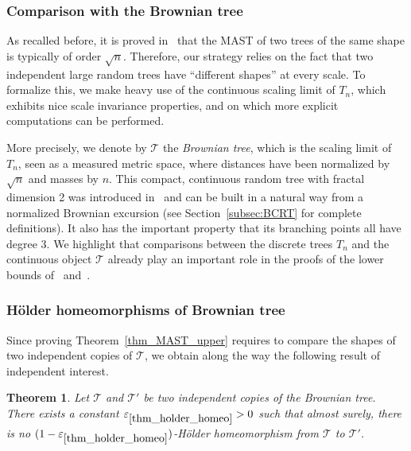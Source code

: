 \documentclass[11pt]{article}
\newcommand{\Tt}{\mathcal{T}}
\let\eps\varepsilon
\theoremstyle{plain}
\newtheorem{theorem}{Theorem}
\theoremstyle{definition}
\numberwithin{equation}{section}
\begin{document}
\subsubsection*{Comparison with the Brownian tree}
As recalled before, it is proved in~\cite{misra_bounds_2019} that the MAST of two trees of the same shape is typically of order $\sqrt{n}$.
Therefore, our strategy relies on the fact that two independent large random trees have ``different shapes'' at every scale.
To formalize this, we make heavy use of the continuous scaling limit of $T_n$, which exhibits nice scale invariance properties, and on which more explicit computations can be performed.

More precisely, we denote by $\Tt$ the \emph{Brownian tree}, which is the scaling limit of~$T_n$, seen as a measured metric space, where distances have been normalized by $\sqrt{n}$ and masses by $n$.
This compact, continuous random tree with fractal dimension 2 was introduced in~\cite{Ald91} and can be built in a natural way from a normalized Brownian excursion (see Section~\ref{subsec:BCRT} for complete definitions). It also has the important property that its branching points all have degree $3$. We highlight that comparisons between the discrete trees $T_n$ and the continuous object $\Tt$ already play an important role in the proofs of the lower bounds of~\cite{aldous_largest_2022} and~\cite{Khez22}.

\subsubsection*{Hölder homeomorphisms of Brownian tree}
Since proving Theorem~\ref{thm_MAST_upper} requires to compare the shapes of two independent copies of $\Tt$, we obtain along the way the following result of independent interest.

\begin{theorem}\label{thm_holder_homeo}
Let $\Tt$ and $\Tt'$ be two independent copies of the Brownian tree. There exists a constant $\eps_{\ref{thm_holder_homeo}}>0$ such that almost surely, there is no $(1-\eps_{\ref{thm_holder_homeo}})$-Hölder homeomorphism from $\Tt$ to $\Tt'$.
\end{theorem}
\end{document}
